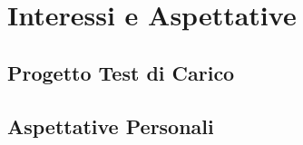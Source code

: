 
\chapter{Interessi e Aspettative}
\label{cap:processi-metodologie}
\begin{comment}
\intro{In questa sezione verranno presentati gli obiettivi del progetto, la pianificazione temporale del periodo di stage, gli interessi aziendali verso i progetti di stage e verso questo progetto nello specifico.\\
In conclusione verrà effettuata una valutazione delle mie aspettative personali.}\\
\end{comment}

\section{Progetto Test di Carico}
\label{sec:progetto-test-di-carico}

\label{sec:interessi-aziendali}

\section{Aspettative Personali}
\label{sec:aspettative-personali}

